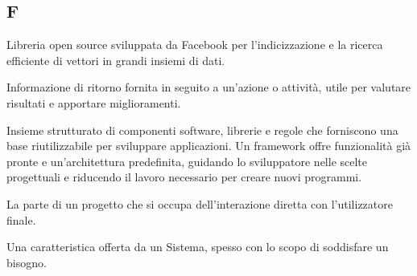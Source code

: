 \begin{center}
\section*{F}
\end{center}

Libreria open source sviluppata da Facebook per l’indicizzazione e la ricerca efficiente di vettori in grandi insiemi di dati.

Informazione di ritorno fornita in seguito a un’azione o attività, utile per valutare risultati e apportare miglioramenti.

Insieme strutturato di componenti software, librerie e regole che forniscono una base riutilizzabile per sviluppare applicazioni. Un framework offre funzionalità già pronte e un’architettura predefinita, guidando lo sviluppatore nelle scelte progettuali e riducendo il lavoro necessario per creare nuovi programmi.

La parte di un progetto che si occupa dell'interazione diretta con l'utilizzatore finale.

Una caratteristica offerta da un Sistema, spesso con lo scopo di soddisfare un bisogno.

